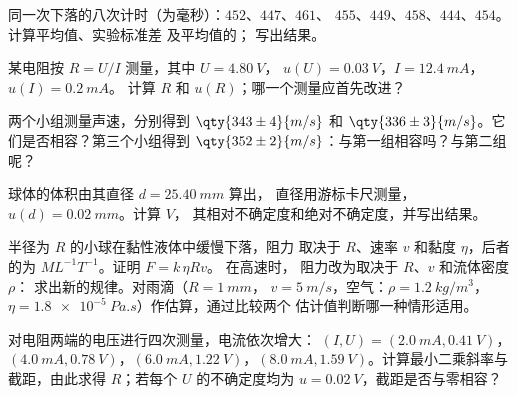 \begin{exercise}[$\star\star$]\label{exo:b1:units-dimensions:6}
同一次下落的八次计时（为毫秒）：$452$、$447$、$461$、
$455$、$449$、$458$、$444$、$454$。计算平均值、实验标准差
及平均值的；
写出结果。
\end{exercise}

\begin{exercise}[$\star\star$]\label{exo:b1:units-dimensions:7}
某电阻按 $R = U/I$ 测量，其中 $U = \qty{4.80}{V}$，
$u(U) = \qty{0.03}{V}$，$I = \qty{12.4}{mA}$，$u(I) = \qty{0.2}{mA}$。
计算 $R$ 和 $u(R)$；哪一个测量应首先改进？
\end{exercise}

\begin{exercise}[$\star\star$]\label{exo:b1:units-dimensions:8}
两个小组测量声速，分别得到 $\qty{343\pm4}{m/s}$ 和
$\qty{336\pm3}{m/s}$。它们是否相容？第三个小组得到
$\qty{352\pm2}{m/s}$：与第一组相容吗？与第二组呢？
\end{exercise}

\begin{exercise}[$\star\star$]\label{exo:b1:units-dimensions:9}
球体的体积由其直径 $d = \qty{25.40}{mm}$ 算出，
直径用游标卡尺测量，$u(d) = \qty{0.02}{mm}$。计算 $V$，
其相对不确定度和绝对不确定度，并写出结果。
\end{exercise}

\begin{exercise}[$\star\star\star$]\label{exo:b1:units-dimensions:10}
半径为 $R$ 的小球在黏性液体中缓慢下落，阻力
取决于 $R$、速率 $v$ 和黏度 $\eta$，后者的为 $M L^{-1} T^{-1}$。证明 $F = k\,\eta R v$。
在高速时，
阻力改为取决于 $R$、$v$ 和流体密度 $\rho$：
求出新的规律。对雨滴（$R = \qty{1}{mm}$，
$v = \qty{5}{m/s}$，空气：$\rho = \qty{1.2}{kg/m^3}$，
$\eta = \qty{1.8e-5}{Pa.s}$）作估算，通过比较两个
估计值判断哪一种情形适用。
\end{exercise}

\begin{exercise}[$\star\star\star$]\label{exo:b1:units-dimensions:11}
对电阻两端的电压进行四次测量，电流依次增大：
$(I, U) = (\qty{2.0}{mA}, \qty{0.41}{V})$，$(\qty{4.0}{mA},
\qty{0.78}{V})$，$(\qty{6.0}{mA}, \qty{1.22}{V})$，$(\qty{8.0}{mA},
\qty{1.59}{V})$。计算最小二乘斜率与截距，由此求得
$R$；若每个 $U$ 的不确定度均为
$u = \qty{0.02}{V}$，截距是否与零相容？
\end{exercise}

